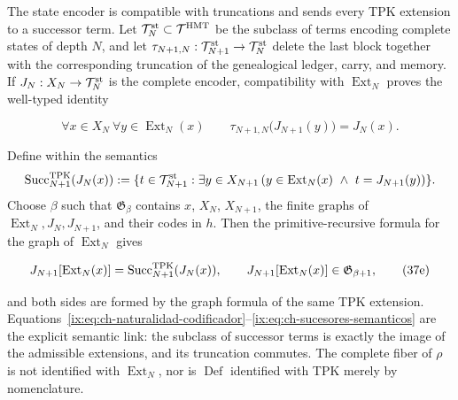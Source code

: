 The state encoder is compatible with truncations and sends every TPK extension
to a successor term. Let
\(\mathcal T_N^{\rm st}\subset\mathcal T^{\rm HMT}\) be the subclass of terms
encoding complete states of depth \(N\), and let
\(\tau_{N+1,N}:\mathcal T_{N+1}^{\rm st}\to\mathcal T_N^{\rm st}\) delete the
last block together with the corresponding truncation of the genealogical
ledger, carry, and memory. If \(J_N:X_N\to\mathcal T_N^{\rm st}\) is the
complete encoder, compatibility with \(\operatorname{Ext}_N\) proves the
well-typed identity

\[
 \forall x\in X_N\ \forall y\in\operatorname{Ext}_N(x)\qquad
 \tau_{N+1,N}\bigl(J_{N+1}(y)\bigr)=J_N(x).
\tag{37e$_0$}\label{ix:eq:ch-naturalidad-codificador}
\]

Define within the semantics
\[
 \operatorname{Succ}^{\rm TPK}_{N+1}(J_N(x)):=
 \{t\in\mathcal T_{N+1}^{\rm st}:\exists y\in X_{N+1}\,
   (y\in\operatorname{Ext}_N(x)\ \wedge\ t=J_{N+1}(y))\}.
\]
Choose \(\beta\) such that \(\mathfrak G_\beta\) contains \(x\), \(X_N\),
\(X_{N+1}\), the finite graphs of
\(\operatorname{Ext}_N,J_N,J_{N+1}\), and their codes in \(h\). Then the
primitive-recursive formula for the graph of \(\operatorname{Ext}_N\) gives

\[
 J_{N+1}[\operatorname{Ext}_N(x)]
 =\operatorname{Succ}^{\rm TPK}_{N+1}(J_N(x)),
 \qquad
 J_{N+1}[\operatorname{Ext}_N(x)]
 \in\mathfrak G_{\beta+1},
\tag{37e}\label{ix:eq:ch-sucesores-semanticos}
\]

and both sides are formed by the graph formula of the same TPK extension.
Equations~\eqref{ix:eq:ch-naturalidad-codificador}--\eqref{ix:eq:ch-sucesores-semanticos}
are the explicit semantic link: the subclass of successor terms is exactly the
image of the admissible extensions, and its truncation commutes. The complete
fiber of \(\rho\) is not identified with \(\operatorname{Ext}_N\), nor is
\(\operatorname{Def}\) identified with TPK merely by nomenclature.

